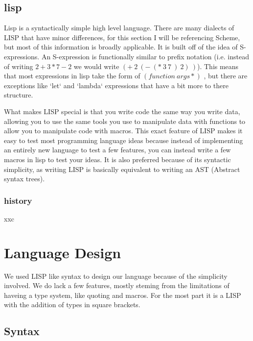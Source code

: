 \documentclass[12pt]{report}
\begin{document}
\section{lisp}
\begin{paragraph}
  Lisp is a syntactically simple high level language. There are many dialects of LISP that have minor differences, for this section I will be referencing Scheme\cite{r7rs}, but most of this information is broadly applicable. It is built off of the idea of S-expressions.\cite{OGLISPpaper} An S-expression is functionally similar to prefix notation (i.e. instead of writing $2+3*7-2$ we would write $(+\ 2\ (-\ (*\ 3\ 7\ )\ 2)\ )$). This means that most expressions in lisp take the form of $(function\ args*)$ , but there are exceptions like `let` and `lambda` expressions that have a bit more to there structure.

  What makes LISP special is that you write code the same way you write data, allowing you to use the same tools you use to manipulate data with functions to allow you to manipulate code with macros. This exact feature of LISP makes it easy to test most programming language ideas because instead of implementing an entirely new language to test a few features, you can instead write a few macros in lisp to test your ideas. It is also preferred because of its syntactic simplicity, as writing LISP is basically equivalent to writing an AST (Abstract syntax trees). %

\end{paragraph}
\subsection{history}
\begin{paragraph}
  \qquad xxc
\end{paragraph}

\chapter{Language Design}
\begin{paragraph}
  We used LISP like syntax to design our language because of the simplicity involved. We do lack a few features, mostly steming from the limitations of haveing a type system, like quoting and macros. For the most part it is a LISP with the addition of types in square brackets.
\end{paragraph}
\section{Syntax}
\end{document}
